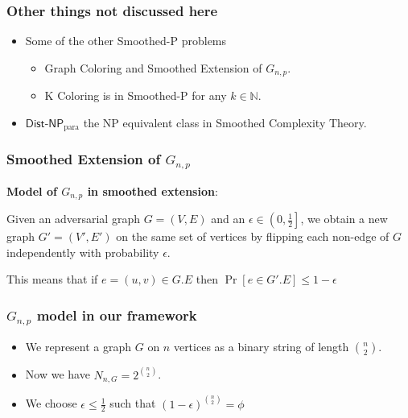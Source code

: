 \begin{frame}
    \frametitle{Other things not discussed here}

    
    \begin{itemize}
        \item Some of the other \textsf{Smoothed-P} problems
            \begin{itemize}
                \item Graph Coloring and Smoothed Extension of $G_{n,p}$.
                \item K Coloring is in \textsf{Smoothed-P} for any $k \in \mathbb{N}$.
            \end{itemize}

        \item $\textsf{Dist-NP}_{\text{para}}$ the \textsf{NP} equivalent class in Smoothed Complexity Theory.
    \end{itemize}

\end{frame}

\begin{frame}
    \frametitle{Smoothed Extension of $G_{n,p}$}

    \textbf{Model of $G_{n,p}$ in smoothed extension}:

    \vspace{1em}

    Given an adversarial graph $G = (V, E)$ and an $\epsilon \in \left(0, \frac{1}{2}\right]$, we obtain
    a new graph $G' = (V', E')$ on the same set of vertices by flipping each non-edge of $G$
    independently with probability $\epsilon$.

    \vspace{1em}

    This means that if $e = (u,v) \in G.E$ then $\Pr[e \in G'.E] \leq 1 - \epsilon$

\end{frame}

\begin{frame}
    \frametitle{$G_{n,p}$ model in our framework}

    
    \begin{itemize}
        \item We represent a graph $G$ on $n$ vertices as a binary string of length $\binom{n}{2}$.
        \item Now we have $N_{n, G} = 2^{\binom{n}{2}}$.
        \item We choose $\epsilon \leq \frac{1}{2}$ such that $(1 - \epsilon)^{\binom{n}{2}} = \phi$
    \end{itemize}

\end{frame}

